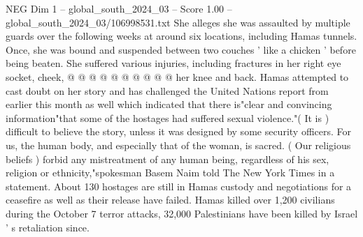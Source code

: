 \begin{textsample}{NEG Dim 1 – global\_south\_2024\_03 – Score 1.00 – global\_south\_2024\_03/106998531.txt}
She alleges she was assaulted by multiple guards over the following weeks at around six locations, including Hamas tunnels.
Once, she was bound and suspended between two couches ' like a chicken ' before being beaten.
She suffered various injuries, including fractures in her right eye socket, cheek, @ @ @ @ @ @ @ @ @ @ her knee and back.
Hamas attempted to cast doubt on her story and has challenged the United Nations report from earlier this month as well which indicated that there is"clear and convincing information"that some of the hostages had suffered sexual violence."( It is ) difficult to believe the story, unless it was designed by some security officers.
For us, the human body, and especially that of the woman, is sacred. ( Our religious beliefs ) forbid any mistreatment of any human being, regardless of his sex, religion or ethnicity,"spokesman Basem Naim told The New York Times in a statement.
About 130 hostages are still in Hamas custody and negotiations for a ceasefire as well as their release have failed.
Hamas killed over 1,200 civilians during the October 7 terror attacks, 32,000 Palestinians have been killed by Israel ' s retaliation since.

\end{textsample}
